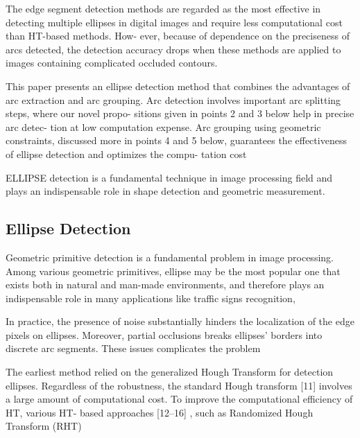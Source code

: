 \documentclass[a4paper]{report}
\begin{document}
The edge segment detection methods are regarded as the most effective in detecting multiple ellipses in digital images and require less computational cost than HT-based methods. How- ever, because of dependence on the preciseness of arcs detected, the detection accuracy drops when these methods are applied to images containing complicated occluded contours.

This paper presents an ellipse detection method that combines the advantages of arc extraction and arc grouping. Arc detection involves important arc splitting steps, where our novel propo- sitions given in points 2 and 3 below help in precise arc detec- tion at low computation expense. Arc grouping using geometric constraints, discussed more in points 4 and 5 below, guarantees the effectiveness of ellipse detection and optimizes the compu- tation cost



ELLIPSE detection is a fundamental technique in image processing field and plays an indispensable role in shape
detection and geometric measurement.


\subsection{Ellipse Detection}
Geometric primitive detection is a fundamental problem in image processing. Among various geometric primitives, ellipse may be the most popular one that exists both in natural and man-made environments, and therefore plays an indispensable role in many applications like traffic signs recognition, 


In practice, the presence of noise substantially hinders the localization of the edge pixels on ellipses. Moreover, partial occlusions breaks ellipses' borders into discrete arc segments. These issues complicates the problem 


The earliest method relied on the generalized Hough Transform for detection ellipses. 
Regardless of the robustness, the standard Hough transform [11] involves a large amount of computational cost.
To improve the computational efficiency of HT, various HT- based approaches [12–16] , such as Randomized Hough Transform (RHT)
\end{document}
